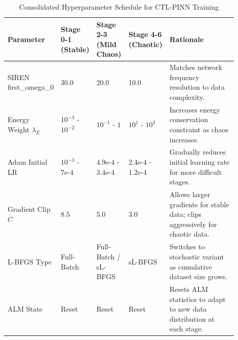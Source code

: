 \begin{table}[H]
\centering
\caption{Consolidated Hyperparameter Schedule for CTL-PINN Training}
\label{tab:hyperparameter_schedule}
\renewcommand{\arraystretch}{1.2}
\begin{tabular}{p{0.18\linewidth} p{0.14\linewidth} p{0.14\linewidth} p{0.14\linewidth} p{0.3\linewidth}}
\toprule
\textbf{Parameter} & \textbf{Stage 0-1 (Stable)} & \textbf{Stage 2-3 (Mild Chaos)} & \textbf{Stage 4-6 (Chaotic)} & \textbf{Rationale} \\
\midrule
SIREN first\_omega\_0 & 30.0 & 20.0 & 10.0 & Matches network frequency resolution to data complexity. \\
Energy Weight $\lambda_E$ & $10^{-3}$ - $10^{-2}$ & $10^{-1}$ - $1$ & $10^{1}$ - $10^{3}$ & Increases energy conservation constraint as chaos increases. \\
Adam Initial LR & $10^{-3}$ - $7\text{e-}4$ & $4.9\text{e-}4$ - $3.4\text{e-}4$ & $2.4\text{e-}4$ - $1.2\text{e-}4$ & Gradually reduces initial learning rate for more difficult stages. \\
Gradient Clip $C$ & 8.5 & 5.0 & 3.0 & Allows larger gradients for stable data; clips aggressively for chaotic data. \\
L-BFGS Type & Full-Batch & Full-Batch / sL-BFGS & sL-BFGS & Switches to stochastic variant as cumulative dataset size grows. \\
ALM State & Reset & Reset & Reset & Resets ALM statistics to adapt to new data distribution at each stage. \\
\bottomrule
\end{tabular}
\renewcommand{\arraystretch}{1.0}
\end{table}

